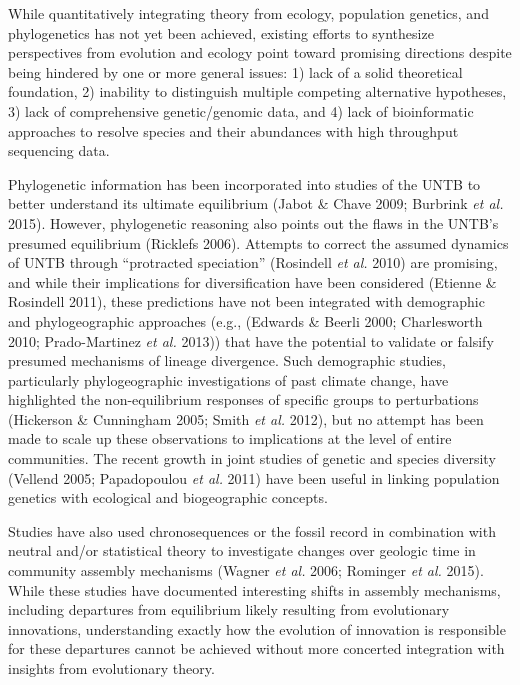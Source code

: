 \documentclass[
]{article}
\begin{document}
While quantitatively integrating theory from ecology, population
genetics, and phylogenetics has not yet been achieved, existing efforts
to synthesize perspectives from evolution and ecology point toward
promising directions despite being hindered by one or more general
issues: 1) lack of a solid theoretical foundation, 2) inability to
distinguish multiple competing alternative hypotheses, 3) lack of
comprehensive genetic/genomic data, and 4) lack of bioinformatic
approaches to resolve species and their abundances with high throughput
sequencing data.

Phylogenetic information has been incorporated into studies of the UNTB
to better understand its ultimate equilibrium (Jabot \& Chave 2009;
Burbrink \emph{et al.} 2015). However, phylogenetic reasoning also
points out the flaws in the UNTB's presumed equilibrium (Ricklefs 2006).
Attempts to correct the assumed dynamics of UNTB through ``protracted
speciation'' (Rosindell \emph{et al.} 2010) are promising, and while
their implications for diversification have been considered (Etienne \&
Rosindell 2011), these predictions have not been integrated with
demographic and phylogeographic approaches (e.g., (Edwards \& Beerli
2000; Charlesworth 2010; Prado-Martinez \emph{et al.} 2013)) that have
the potential to validate or falsify presumed mechanisms of lineage
divergence. Such demographic studies, particularly phylogeographic
investigations of past climate change, have highlighted the
non-equilibrium responses of specific groups to perturbations (Hickerson
\& Cunningham 2005; Smith \emph{et al.} 2012), but no attempt has been
made to scale up these observations to implications at the level of
entire communities. The recent growth in joint studies of genetic and
species diversity (Vellend 2005; Papadopoulou \emph{et al.} 2011) have
been useful in linking population genetics with ecological and
biogeographic concepts.

Studies have also used chronosequences or the fossil record in
combination with neutral and/or statistical theory to investigate
changes over geologic time in community assembly mechanisms (Wagner
\emph{et al.} 2006; Rominger \emph{et al.} 2015). While these studies
have documented interesting shifts in assembly mechanisms, including
departures from equilibrium likely resulting from evolutionary
innovations, understanding exactly how the evolution of innovation is
responsible for these departures cannot be achieved without more
concerted integration with insights from evolutionary theory.
\end{document}
